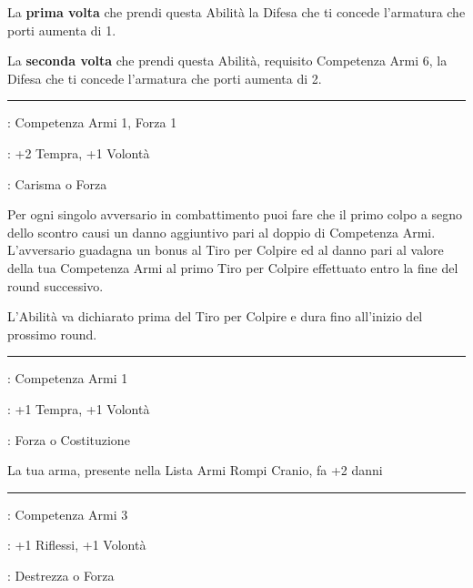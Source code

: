 \begin{multicols}{2}
La \textbf{prima volta} che prendi questa Abilità la Difesa che ti concede l'armatura che porti aumenta di 1.

La \textbf{seconda volta} che prendi questa Abilità, requisito Competenza Armi 6, la Difesa che ti concede l'armatura che porti aumenta di 2.

\smallskip\noindent\rule{\linewidth}{2pt} \hypertarget{La mia morte la tua morte}{}\medskip{}
\noindent
\begin{description}[noitemsep, topsep=0pt, parsep=0pt, partopsep=0pt, leftmargin=0cm, labelwidth=2.5cm]
    \item[\textbf{Requisito}]: Competenza Armi 1, Forza 1


    \item[\textbf{Tiri Salvezza}]: +2 Tempra, +1 Volontà
    \item[\textbf{Caratteristica}]: Carisma o Forza
\end{description}

Per ogni singolo avversario in combattimento puoi fare che il primo colpo a segno dello scontro causi un danno aggiuntivo pari al doppio di Competenza Armi. L'avversario guadagna un bonus al Tiro per Colpire ed al danno pari al valore della tua Competenza Armi al primo Tiro per Colpire effettuato entro la fine del round successivo.

L'Abilità va dichiarato prima del Tiro per Colpire e dura fino all'inizio del prossimo round.

\smallskip\noindent\rule{\linewidth}{2pt} \hypertarget{La mia Testa è più Dura}{}\medskip{}
\noindent
\begin{description}[noitemsep, topsep=0pt, parsep=0pt, partopsep=0pt, leftmargin=0cm, labelwidth=2.5cm]
    \item[\textbf{Requisito}]: Competenza Armi 1
    \item[\textbf{Tiri Salvezza}]: +1 Tempra, +1 Volontà
    \item[\textbf{Caratteristica}]: Forza o Costituzione
\end{description}

La tua arma, presente nella Lista Armi Rompi Cranio, fa +2 danni

\smallskip\noindent\rule{\linewidth}{2pt} \hypertarget{Lesto}{}\medskip{}
\noindent
\begin{description}[noitemsep, topsep=0pt, parsep=0pt, partopsep=0pt, leftmargin=0cm, labelwidth=2.5cm]
    \item[\textbf{Requisito}]: Competenza Armi 3
    \item[\textbf{Tiri Salvezza}]: +1 Riflessi, +1 Volontà
    \item[\textbf{Caratteristica}]: Destrezza o Forza
\end{description}


\end{multicols}
